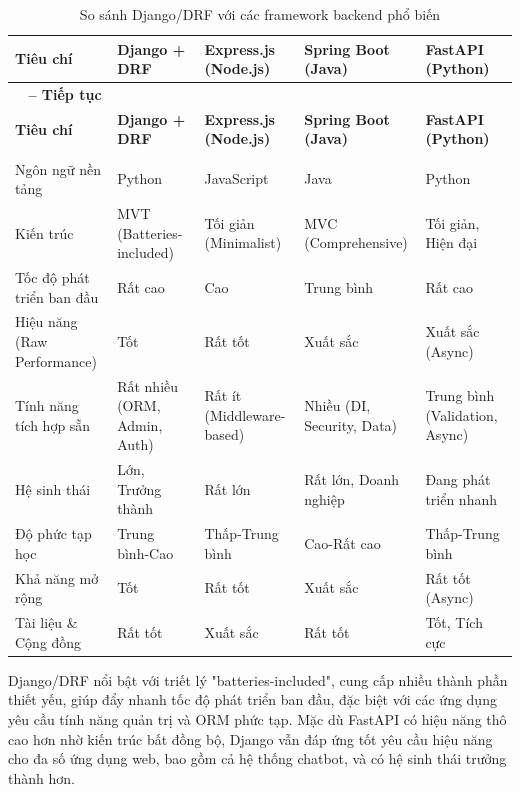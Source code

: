 \begin{enumerate}[label=\arabic*., font=\bfseries]
    \begin{longtable}{|>{\raggedright\arraybackslash}p{2.5cm}|>{\centering\arraybackslash}p{2.5cm}|>{\centering\arraybackslash}p{2.5cm}|>{\centering\arraybackslash}p{2.5cm}|>{\centering\arraybackslash}p{2.5cm}|}
        \caption{So sánh Django/DRF với các framework backend phổ biến}\\
        \hline
        \textbf{Tiêu chí} & \textbf{Django + DRF} & \textbf{Express.js (Node.js)} & \textbf{Spring Boot (Java)} & \textbf{FastAPI (Python)} \\
        \hline \endfirsthead
        \multicolumn{5}{c}%
        {{\bfseries \tablename\ \thetable{} -- Tiếp tục}} \\
        \hline
        \textbf{Tiêu chí} & \textbf{Django + DRF} & \textbf{Express.js (Node.js)} & \textbf{Spring Boot (Java)} & \textbf{FastAPI (Python)} \\
        \hline \endhead
        \hline \multicolumn{5}{r}{{Tiếp tục ở trang sau}} \\ \endfoot
        \hline \endlastfoot
        Ngôn ngữ nền tảng & Python & JavaScript & Java & Python \\
        \hline
        Kiến trúc & MVT (Batteries-included) & Tối giản (Minimalist) & MVC (Comprehensive) & Tối giản, Hiện đại \\
        \hline
        Tốc độ phát triển ban đầu & Rất cao & Cao & Trung bình & Rất cao \\
        \hline
        Hiệu năng (Raw Performance) & Tốt & Rất tốt & Xuất sắc & Xuất sắc (Async) \\
        \hline
        Tính năng tích hợp sẵn & Rất nhiều (ORM, Admin, Auth) & Rất ít (Middleware-based) & Nhiều (DI, Security, Data) & Trung bình (Validation, Async) \\
        \hline
        Hệ sinh thái & Lớn, Trưởng thành & Rất lớn & Rất lớn, Doanh nghiệp & Đang phát triển nhanh \\
        \hline
        Độ phức tạp học & Trung bình-Cao & Thấp-Trung bình & Cao-Rất cao & Thấp-Trung bình \\
        \hline
        Khả năng mở rộng & Tốt & Rất tốt & Xuất sắc & Rất tốt (Async) \\
        \hline
        Tài liệu \& Cộng đồng & Rất tốt & Xuất sắc & Rất tốt & Tốt, Tích cực \\
        \hline
    \end{longtable}
    Django/DRF nổi bật với triết lý "batteries-included", cung cấp nhiều thành phần thiết yếu, giúp đẩy nhanh tốc độ phát triển ban đầu, đặc biệt với các ứng dụng yêu cầu tính năng quản trị và ORM phức tạp. Mặc dù FastAPI có hiệu năng thô cao hơn nhờ kiến trúc bất đồng bộ, Django vẫn đáp ứng tốt yêu cầu hiệu năng cho đa số ứng dụng web, bao gồm cả hệ thống chatbot, và có hệ sinh thái trưởng thành hơn.


\end{enumerate}
